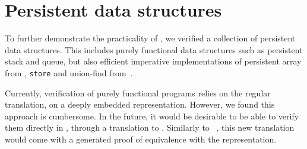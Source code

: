 \section{Persistent data structures}
\label{sec:persistent}

To further demonstrate the practicality of \Zoo, we verified a collection of persistent data structures.
This includes purely functional data structures such as persistent stack and queue, but also efficient imperative implementations of persistent array from \citet{DBLP:conf/ml/ConchonF07}, \texttt{store} and union-find from~\citet{DBLP:journals/pacmpl/AllainC0S24}.

Currently, verification of purely functional programs relies on the regular \ZooLang translation, \ie on a deeply embedded representation.
However, we found this approach is cumbersome.
In the future, it would be desirable to be able to verify them directly in \Rocq, through a translation to \Gallina.
Similarly to \Hacspec~\citep{DBLP:conf/cpp/HaselwarterHHWH24}, this new translation would come with a generated proof of equivalence with the \ZooLang representation.

